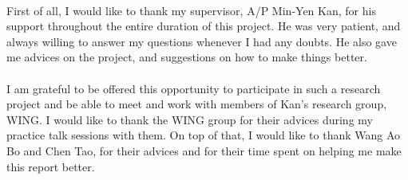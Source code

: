 \documentclass[hyp]{socreport}
\begin{document}
\begin{acknowledgement}
\paragraph{}
First of all, I would like to thank my supervisor, A/P Min-Yen Kan, for his support throughout the entire duration of this project. He was very patient, and always willing to answer my questions whenever I had any doubts. He also gave me advices on the project, and suggestions on how to make things better.

\paragraph{}
I am grateful to be offered this opportunity to participate in such a research project and be able  to meet and work with members of Kan's research group, WING. I would like to thank the WING group for their advices during my practice talk sessions with them. On top of that, I would like to thank Wang Ao Bo and Chen Tao, for their advices and for their time spent on helping me make this report better.
\end{acknowledgement}

\listoffigures
\listoftables
\tableofcontents




 





\appendix
\end{document}
